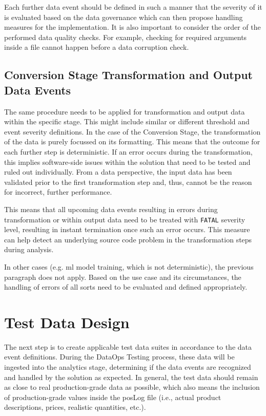 Each further data event should be defined in such a manner that the severity of it is evaluated based on the data governance which can then propose handling measures for the implementation. It is also important to consider the order of the performed data quality checks. For example, checking for required arguments inside a file cannot happen before a data corruption check.

\subsection{Conversion Stage Transformation and Output Data Events}
The same procedure needs to be applied for transformation and output data within the specific stage. This might include similar or different threshold and event severity definitions. In the case of the Conversion Stage, the transformation of the data is purely focussed on its formatting. This means that the outcome for each further step is deterministic. If an error occurs during the transformation, this implies software-side issues within the solution that need to be tested and ruled out individually. From a data perspective, the input data has been validated prior to the first transformation step and, thus, cannot be the reason for incorrect, further performance.

This means that all upcoming data events resulting in errors during transformation or within output data need to be treated with \texttt{FATAL} severity level, resulting in instant termination once such an error occurs. This measure can help detect an underlying source code problem in the transformation steps during analysis.

In other cases (e.g. \acs{ml} model training, which is not deterministic), the previous paragraph does not apply. Based on the use case and its circumstances, the handling of errors of all sorts need to be evaluated and defined appropriately.

\section{Test Data Design}
The next step is to create applicable test data suites in accordance to the data event definitions. During the DataOps Testing process, these data will be ingested into the analytics stage, determining if the data events are recognized and handled by the solution as expected. In general, the test data should remain as close to real production-grade data as possible, which also means the inclusion of production-grade values inside the \ac{pos}Log file (i.e., actual product descriptions, prices, realistic quantities, etc.).

